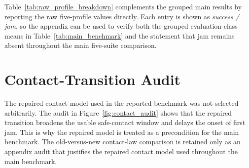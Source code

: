 ﻿\documentclass[11pt]{article}
\begin{document}
Table~\ref{tab:raw_profile_breakdown} complements the grouped main results by reporting the raw
five-profile values directly. Each entry is shown as \emph{success / jam}, so the appendix can be
used to verify both the grouped evaluation-class means in Table~\ref{tab:main_benchmark} and the
statement that jam remains absent throughout the main five-suite comparison.

\begin{table}[!htbp]
  \centering
  \small
  \caption{Raw nominal-profile breakdown for the main five learned suites. Entries are reported as
  \emph{success / jam}; the rightmost column reports the 5-profile mean in the same format.}
  \label{tab:raw_profile_breakdown}
\end{table}
\FloatBarrier

\section{Contact-Transition Audit}
\label{app:contact-audit}

The repaired contact model used in the reported benchmark was not selected arbitrarily. The
audit in Figure~\ref{fig:contact_audit} shows that the repaired transition broadens the usable
safe-contact window and delays the onset of first jam. This is why the repaired model is treated
as a precondition for the main benchmark. The old-versus-new contact-law comparison is retained
only as an appendix audit that justifies the repaired contact model used throughout the main
benchmark.
\end{document}
